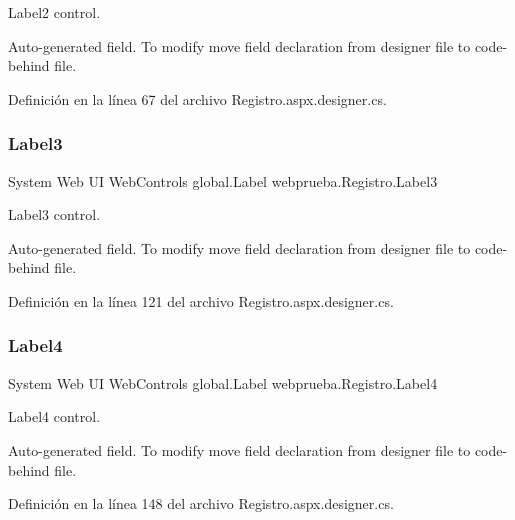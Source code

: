 Label2 control. 

Auto-\/generated field. To modify move field declaration from designer file to code-\/behind file. 

Definición en la línea 67 del archivo Registro.\+aspx.\+designer.\+cs.

\mbox{\label{classwebprueba_1_1_registro_a03f09c3a70d4b6d61e6ff24e40f6fb77}} 
\subsubsection{\texorpdfstring{Label3}{Label3}}
{\footnotesize\ttfamily System Web UI Web\+Controls global.\+Label webprueba.\+Registro.\+Label3\hspace{0.3cm}{\ttfamily [protected]}}



Label3 control. 

Auto-\/generated field. To modify move field declaration from designer file to code-\/behind file. 

Definición en la línea 121 del archivo Registro.\+aspx.\+designer.\+cs.

\mbox{\label{classwebprueba_1_1_registro_a09f3a5f7b4c2a6e6df111f4b86118c68}} 
\subsubsection{\texorpdfstring{Label4}{Label4}}
{\footnotesize\ttfamily System Web UI Web\+Controls global.\+Label webprueba.\+Registro.\+Label4\hspace{0.3cm}{\ttfamily [protected]}}



Label4 control. 

Auto-\/generated field. To modify move field declaration from designer file to code-\/behind file. 

Definición en la línea 148 del archivo Registro.\+aspx.\+designer.\+cs.

\mbox{\label{classwebprueba_1_1_registro_a7ddf3c33c56714110d105285b718f4df}} 
